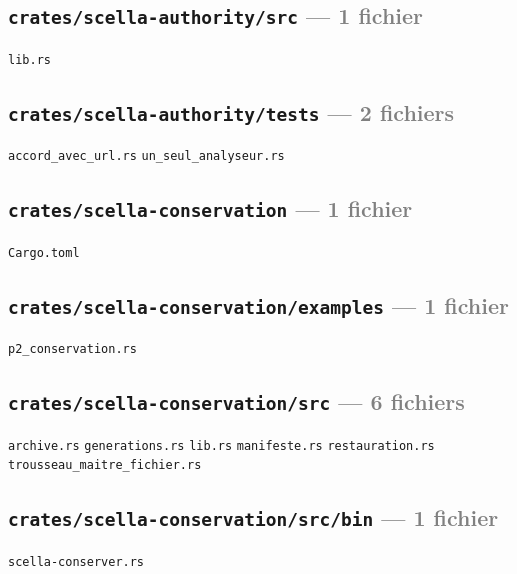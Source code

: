 \documentclass[10pt]{report}
\newcommand{\code}[1]{\texttt{\small #1}}
\begin{document}
\subsection*{\code{crates/scella-authority/src} \normalfont\textcolor{grey}{--- 1 fichier}}
\begin{sloppypar}\footnotesize\raggedright
\code{lib.rs}
\end{sloppypar}

\subsection*{\code{crates/scella-authority/tests} \normalfont\textcolor{grey}{--- 2 fichiers}}
\begin{sloppypar}\footnotesize\raggedright
\code{accord\_avec\_url.rs} \;\textbullet\; \code{un\_seul\_analyseur.rs}
\end{sloppypar}

\subsection*{\code{crates/scella-conservation} \normalfont\textcolor{grey}{--- 1 fichier}}
\begin{sloppypar}\footnotesize\raggedright
\code{Cargo.toml}
\end{sloppypar}

\subsection*{\code{crates/scella-conservation/examples} \normalfont\textcolor{grey}{--- 1 fichier}}
\begin{sloppypar}\footnotesize\raggedright
\code{p2\_conservation.rs}
\end{sloppypar}

\subsection*{\code{crates/scella-conservation/src} \normalfont\textcolor{grey}{--- 6 fichiers}}
\begin{sloppypar}\footnotesize\raggedright
\code{archive.rs} \;\textbullet\; \code{generations.rs} \;\textbullet\; \code{lib.rs} \;\textbullet\; \code{manifeste.rs} \;\textbullet\; \code{restauration.rs} \;\textbullet\; \code{trousseau\_maitre\_fichier.rs}
\end{sloppypar}

\subsection*{\code{crates/scella-conservation/src/bin} \normalfont\textcolor{grey}{--- 1 fichier}}
\begin{sloppypar}\footnotesize\raggedright
\code{scella-conserver.rs}
\end{sloppypar}
\end{document}
